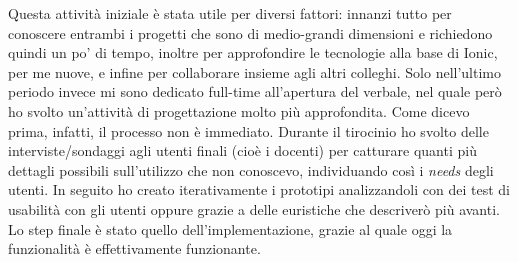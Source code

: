 \documentclass[Lau, oneside, noexaminfo]{sapthesis}%
\begin{document}
Questa attività iniziale è stata utile per diversi fattori: innanzi tutto per conoscere entrambi i progetti che sono di medio-grandi dimensioni e richiedono quindi un po' di tempo, inoltre per approfondire le tecnologie alla base di Ionic, per me nuove, e infine per collaborare insieme agli altri colleghi. Solo nell'ultimo periodo invece mi sono dedicato full-time all'apertura del verbale, nel quale però ho svolto un'attività di progettazione molto più approfondita. Come dicevo prima, infatti, il processo non è immediato. Durante il tirocinio ho svolto delle interviste/sondaggi agli utenti finali (cioè i docenti) per catturare quanti più dettagli possibili sull'utilizzo che non conoscevo, individuando così i \textit{needs} degli utenti. In seguito ho creato iterativamente i prototipi analizzandoli con dei test di usabilità con gli utenti oppure grazie a delle euristiche che descriverò più avanti. Lo step finale è stato quello dell'implementazione, grazie al quale oggi la funzionalità è effettivamente funzionante.
\end{document}

